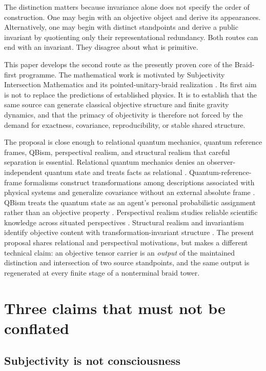 \documentclass[11pt]{article}
\theoremstyle{definition}
\theoremstyle{remark}
\begin{document}
The distinction matters because invariance alone does not specify the order of construction. One may begin with an objective object and derive its appearances. Alternatively, one may begin with distinct standpoints and derive a public invariant by quotienting only their representational redundancy. Both routes can end with an invariant. They disagree about what is primitive.

This paper develops the second route as the presently proven core of the Braid-first programme. The mathematical work is motivated by Subjectivity Intersection Mathematics and its pointed-unitary-braid realization \cite{watanabe2026sim,watanabe2026braid}. Its first aim is not to replace the predictions of established physics. It is to establish that the same source can generate classical objective structure and finite gravity dynamics, and that the primacy of objectivity is therefore not forced by the demand for exactness, covariance, reproducibility, or stable shared structure.

The proposal is close enough to relational quantum mechanics, quantum reference frames, QBism, perspectival realism, and structural realism that careful separation is essential. Relational quantum mechanics denies an observer-independent quantum state and treats facts as relational \cite{rovelli1996}. Quantum-reference-frame formalisms construct transformations among descriptions associated with physical systems and generalize covariance without an external absolute frame \cite{giacomini2019,vanrietvelde2020}. QBism treats the quantum state as an agent's personal probabilistic assignment rather than an objective property \cite{fuchs2013}. Perspectival realism studies reliable scientific knowledge across situated perspectives \cite{massimi2022,massimi2023}. Structural realism and invariantism identify objective content with transformation-invariant structure \cite{weyl1952,ladyman1998}. The present proposal shares relational and perspectival motivations, but makes a different technical claim: an objective tensor carrier is an \emph{output} of the maintained distinction and intersection of two source standpoints, and the same output is regenerated at every finite stage of a nonterminal braid tower.

\section{Three claims that must not be conflated}

\subsection{Subjectivity is not consciousness}
\end{document}
